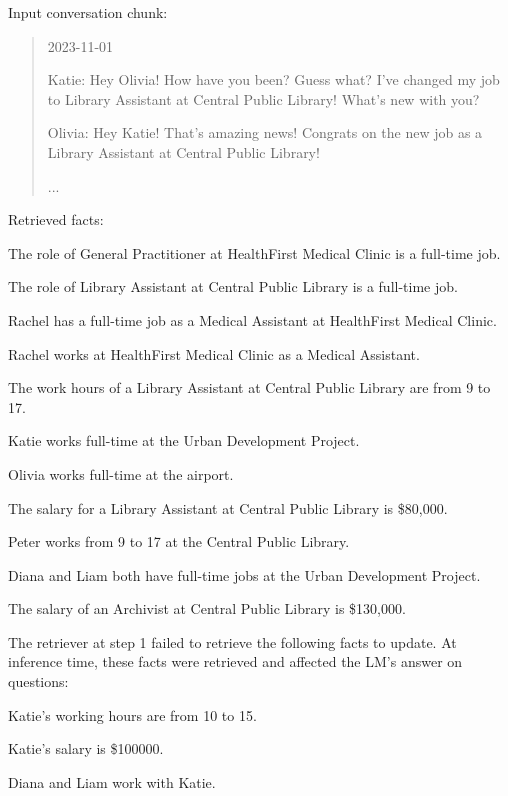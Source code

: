 Input conversation chunk:
\begin{quote}
\it{
2023-11-01

Katie: Hey Olivia! How have you been? Guess what? I've changed my job to Library Assistant at Central Public Library! What's new with you?

Olivia: Hey Katie! That's amazing news! Congrats on the new job as a Library Assistant at Central Public Library!

...
}
\end{quote}

Retrieved facts:

\begin{itemize}
\it{
\item The role of General Practitioner at HealthFirst Medical Clinic is a full-time job.
\item The role of Library Assistant at Central Public Library is a full-time job.
\item Rachel has a full-time job as a Medical Assistant at HealthFirst Medical Clinic.
\item Rachel works at HealthFirst Medical Clinic as a Medical Assistant.
\item The work hours of a Library Assistant at Central Public Library are from 9 to 17.
\item Katie works full-time at the Urban Development Project.
\item Olivia works full-time at the airport.
\item The salary for a Library Assistant at Central Public Library is \$80,000.
\item Peter works from 9 to 17 at the Central Public Library.
\item Diana and Liam both have full-time jobs at the Urban Development Project.
\item The salary of an Archivist at Central Public Library is \$130,000.
}
\end{itemize}

The retriever at step 1 failed to retrieve the following facts to update. At inference time, these facts were retrieved and affected the LM's answer on questions:
\begin{itemize}
{\color{red}
\it{
\item Katie's working hours are from 10 to 15.
\item Katie's salary is \$100000.
\item Diana and Liam work with Katie.
}
}
\end{itemize}



